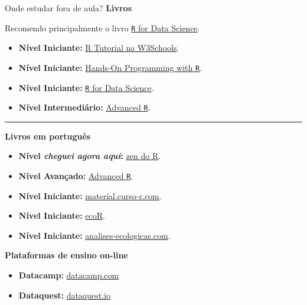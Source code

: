 \documentclass[
  10pt,
  ignorenonframetext,
]{beamer}
\providecommand{\tightlist}{%
  \setlength{\itemsep}{0pt}\setlength{\parskip}{0pt}}\usepackage{longtable,booktabs,array}
\newcommand*{\regrafina}{\rule{\textwidth}{0.5pt}}
\begin{document}
\begin{frame}[fragile]{Onde estudar fora de aula?}
\protect\hypertarget{onde-estudar-fora-de-aula}{}
\textbf{Livros }

Recomendo principalmente o livro
\href{https://r4ds.had.co.nz}{\texttt{R} for Data Science}.

\vspace{0.5cm}

\begin{itemize}
\tightlist
\item
  \textbf{Nível Iniciante:}
  \href{https://www.w3schools.com/r/default.asp}{R Tutorial na
  W3Schools}.
\item
  \textbf{Nível Iniciante:}
  \href{https://rstudio-education.github.io/hopr/}{Hands-On Programming
  with \texttt{R}}.
\item
  \textbf{Nível Iniciante:} \href{https://r4ds.had.co.nz}{\texttt{R} for
  Data Science}.
\item
  \textbf{Nível Intermediário:} \href{https://adv-r.hadley.nz/}{Advanced
  \texttt{R}}.
\end{itemize}

\regrafina

\textbf{Livros em português}

\begin{itemize}
\tightlist
\item
  \textbf{Nível \emph{cheguei agora aqui}:}
  \href{https://curso-r.github.io/zen-do-r/index.html}{zen do R}.
\item
  \textbf{Nível Avançado:} \href{https://adv-r.hadley.nz}{Advanced
  \texttt{R}}.
\item
  \textbf{Nível Iniciante:}
  \href{http://material.curso-r.com/}{material.curso-r.com}.
\item
  \textbf{Nível Iniciante:} \href{http://ecor.ib.usp.br/doku.php}{ecoR}.
\item
  \textbf{Nível Iniciante:}
  \href{https://analises-ecologicas.com/}{analises-ecologicas.com}.
\end{itemize}
\end{frame}

\begin{frame}
\textbf{Plataformas de ensino on-line}

\begin{itemize}
\tightlist
\item
  \textbf{Datacamp:} \href{https://www.datacamp.com/}{datacamp.com}
\item
  \textbf{Dataquest:} \href{https://www.dataquest.io/}{dataquest.io}
\end{itemize}
\end{frame}
\end{document}
